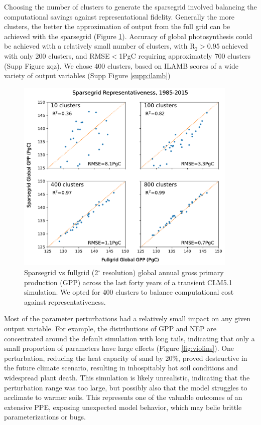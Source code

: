 \documentclass[draft]{agujournal2019}
\begin{document}
Choosing the number of clusters to generate the sparsegrid involved balancing the computational savings against representational fidelity. Generally the more clusters, the 
better the approximation of output from the full grid can be achieved with the sparsegrid (Figure \ref{fig:sg}). Accuracy of global photosynthesis could be achieved with a relatively small number of clusters, with R$_2>$0.95 achieved with only 200 clusters, and RMSE$<$1PgC requiring approximately 700 clusters (Supp Figure zqz). We chose 400 clusters, based on ILAMB scores of a wide variety of output variables (Supp Figure \ref{supp:ilamb})
\begin{figure}[h]
\centering
\includegraphics[width=25pc]{../figs/sparsegrid_gpp.pdf}
\caption{Sparsegrid vs fullgrid (2$^{\circ}$ resolution) global annual gross primary production (GPP) across the last forty years of a transient CLM5.1 simulation. We opted for 400 clusters to balance computational cost against representativeness.}
\label{fig:sg}
\end{figure}

Most of the parameter perturbations had a relatively small impact on any given output variable. For example, the distributions of GPP and NEP are concentrated around the default simulation with long tails, indicating that only a small proportion of parameters have large effects (Figure \ref{fig:violins}). One perturbation, reducing the heat capacity of sand by 20\%, proved destructive in the future climate scenario, resulting in inhospitably hot soil conditions and widespread plant death. This simulation is likely unrealistic, indicating that the perturbation range was too large, but possibly also that the model struggles to acclimate to warmer soils. This represents one of the valuable outcomes of an extensive PPE, exposing unexpected model behavior, which may belie brittle parameterizations or bugs.
\end{document}
